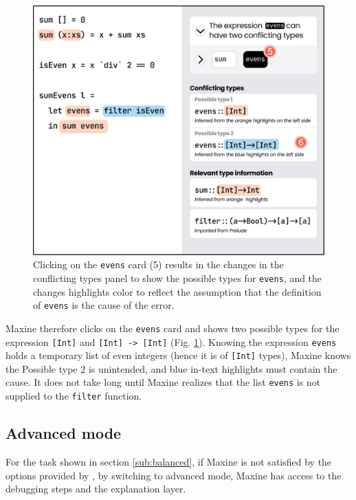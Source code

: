 \begin{figure}
   \centering
        \includegraphics[width=\linewidth]{images/balanced-mode-2.pdf}
        \caption{
            Clicking on the \texttt{evens} card (5) results in the changes in the
            conflicting types panel to show the possible types for \texttt{evens},
            and the changes highlights color to reflect the assumption that the
            definition of \texttt{evens} is the cause of the error.  
        }
        \label{fig:balance-mode-2}
\end{figure}



Maxine therefore clicks on the \texttt{evens} card and \chameleon{} shows two
possible types for the expression \texttt{[Int]} and \texttt{[Int] -> [Int]}
(Fig. \ref{fig:balance-mode-2}). Knowing the expression \texttt{evens} holds
a temporary list of even integers (hence it is of \texttt{[Int]} types), Maxine
knows the Possible type 2 is unintended, and blue in-text highlights must
contain the cause. It does not take long until Maxine realizes that the list 
\texttt{evens} is not supplied to the \texttt{filter} function.


\subsection{Advanced mode}  \label{sub:advanced}


For the task shown in section \ref{sub:balanced}, if Maxine is not satisfied by
the options provided by \chameleon{}, by switching to advanced
mode, Maxine has access to the debugging steps and the explanation layer. 

